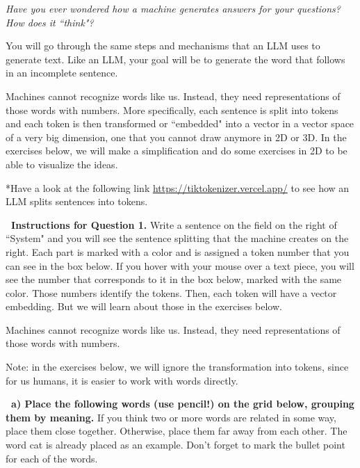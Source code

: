 \documentclass[12pt]{article}
\makeatletter
\newcounter{exercise}
\newcommand{\exercisetitle}[2][]{%
  \refstepcounter{exercise}%
  \vspace{0.5cm}%
  \colorbox{maincolor}{%
    \makebox[\dimexpr\linewidth-2\fboxsep][l]{%
      \textcolor{white}{\faPen\ Assignment \theexercise:~ #2}%
    }%
  }%
  \if\relax\detokenize{#1}\relax\else\label{#1}\fi
  \vspace{0.3cm}%
}
\newcounter{question}
\newlength\questionheight
\newcommand{\question}{\@ifstar{\question@text}{\question@field}}
\newcommand{\question@heading}[1]{%
  \refstepcounter{question}%
  \vspace{0.3cm}%
  \noindent\textbf{\faEdit\ Question \thequestion: #1}%
}
\newcommand{\question@text}[1]{%
  \question@heading{#1}%
}
\newcommand{\question@field}[2][\questionheight]{%
  \question@heading{#2}%
 \\[0.3em] \begin{Form}
    \TextField[
      name=Q\thequestion,
      multiline=true,
      width=\linewidth,
      height=#1,
      charsize=10pt,
      bordercolor={0 0 0},
      borderwidth=1.8,
      backgroundcolor={1 1 1}
    ]{}
  \end{Form}
  \vspace{0.3cm}%
}
\makeatother
\begin{document}
\textit{Have you ever wondered how a machine generates answers for your questions? How does it ``think"?
}
\vspace{0.3cm}

You will go through the same steps and mechanisms that an LLM uses to generate text. Like an LLM, your goal will be to generate the word that follows in an incomplete sentence.

\exercisetitle{Word embeddings}

Machines cannot recognize words like us. Instead, they need representations of those words with numbers. More specifically, each sentence is split into tokens and each token is then transformed or ``embedded" into a vector in a vector space of a very big dimension, one that you cannot draw anymore in 2D or 3D. In the exercises below, we will make a simplification and do some exercises in 2D to be able to visualize the ideas.

\question*{Have a look at the following link \hyperlink{maincolor}{https://tiktokenizer.vercel.app/} to see how an LLM splits sentences into tokens.}

\vspace{0.3cm}
\textcolor{maincolor}{\textbf{\faPen\ Instructions for Question 1.}} Write a sentence on the field on the right of ``System" and you will see the sentence splitting that the machine creates on the right. Each part is marked with a color and is assigned a token number that you can see in the box below. If you hover with your mouse over a text piece, you will see the number that corresponds to it in the box below, marked with the same color. Those numbers identify the tokens. Then, each token will have a vector embedding. But we will learn about those in the exercises below.

\begin{importantbox}
    Machines cannot recognize words like us. Instead, they need representations of those words with numbers.
\end{importantbox}

Note: in the exercises below, we will ignore the transformation into tokens, since for us humans, it is easier to work with words directly.

\vspace{0.5cm}

\textcolor{maincolor}{\textbf{\faPen\ a) Place the following words (use pencil!) on the grid below, grouping them by meaning.}} If you think two or more words are related in some way, place them close together. Otherwise, place them far away from each other. The word cat is already placed as an example. Don't forget to mark the bullet point for each of the words. 
\end{document}
